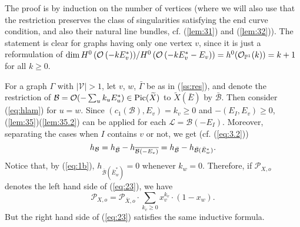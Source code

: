 \documentclass[10pt,a4paper]{amsart}
\numberwithin{equation}{section}
\numberwithin{equation}{subsection}
\theoremstyle{plain}
\theoremstyle{definition}
\begin{document}
The proof is by induction on the number of vertices (where
we will also use that  the restriction preserves the class of
singularities satisfying the end curve condition, and also their
natural line bundles, cf. (\ref{lem:31}) and (\ref{lem:32})).  The
statement is clear for graphs having only one vertex \(v\), since
it is just a reformulation of \(\dim {\mathchoice
         \frac{{H^0 \left(
{{\mathinner{{{    \mathcal{O}}}\sb{{}}}    {\left({{- k
    E_v^*}}\right)}}} \right)}}{{H^0 \left( {{\mathinner{{{    \mathcal{O}}}\sb{{}}}    {\left({{- k
    E_v^* - E_v}}\right)}}} \right)}}   
  {\mathinner{{{H^0 \left(
{{\mathinner{{{    \mathcal{O}}}\sb{{}}}    {\left({{- k
    E_v^*}}\right)}}} \right)}}/{{H^0 \left( {{\mathinner{{{    \mathcal{O}}}\sb{{}}}    {\left({{- k
    E_v^* - E_v}}\right)}}} \right)}}}}
  {\mathinner{{{H^0 \left(
{{\mathinner{{{    \mathcal{O}}}\sb{{}}}    {\left({{- k
    E_v^*}}\right)}}} \right)}}/{{H^0 \left( {{\mathinner{{{    \mathcal{O}}}\sb{{}}}    {\left({{- k
    E_v^* - E_v}}\right)}}} \right)}}}}
  {\mathinner{{{H^0 \left(
{{\mathinner{{{    \mathcal{O}}}\sb{{}}}    {\left({{- k
    E_v^*}}\right)}}} \right)}}/{{H^0 \left( {{\mathinner{{{    \mathcal{O}}}\sb{{}}}    {\left({{- k
    E_v^* - E_v}}\right)}}} \right)}}}}
} =h^0({\mathcal{O}}_{{\mathbb{P}}^1}(k))= k + 1\) for all  \(k\geq 0\).

For a graph \(\Gamma\) with $|{\mathcal{V}}|>1$, let $v$, $w$,
$\bar{\Gamma}$ be as in (\ref{ss:res}), and denote the restriction
of ${\mathcal{B}}={\mathcal{O}}(-\sum_uk_uE^*_u)\in {\rm Pic}(\widetilde{X})$ to
${\widetilde{X}(\bar{E})}$ by $\bar{\mathcal{B}}$. Then consider (\ref{eq:hlam}) for $u=w$.
Since $(c_1({\mathcal{B}}),E_v)=k_v\geq 0$ and $-(E_I,E_v)\geq 0$,
(\ref{lem:35})(\ref{lem:35.2}) can be applied for each
${\mathcal{L}}={\mathcal{B}}(-E_I)$. Moreover, separating the cases when $I$
contains $v$ or not, we get (cf. (\ref{eq:3.2}))
\begin{equation*}
  h_{\mathcal{B}} =
h_{\bar{\mathcal{B}}}   - h_{\overline{{\mathinner{{\mathcal{B}}\sb{}}    {\left({- E_v}\right)}}}}=
h_{\bar{\mathcal{B}}}   - h_{\bar{\mathcal{B}}( \bar{E}^*_w)}.
\end{equation*}
Notice that, by (\ref{eq:1b}), $h_{\bar{\mathcal{B}}(\bar{E}^*_w)}=0$
whenever $k_w=0$. Therefore, if ${\mathcal{P}}_{X,o}$ denotes the left hand
side of (\ref{eq:23}), we have
\begin{equation*}
  {\mathcal{P}}_{X,o} = {\mathcal{P}}_{\bar{X},o} \cdot \sum_{k_v\geq 0} x_v^{k_v} \cdot (1-x_w).
\end{equation*}
But the right hand side of (\ref{eq:23}) satisfies the same
inductive formula.
\end{document}
